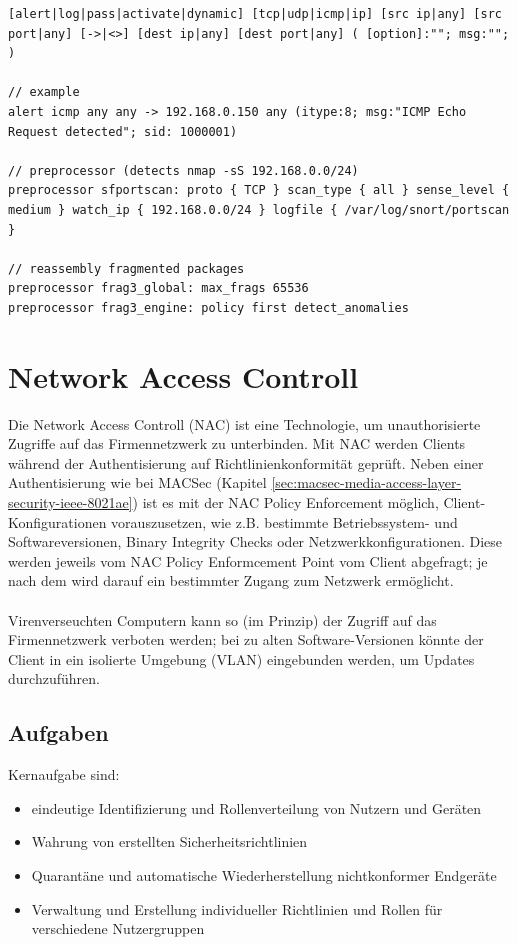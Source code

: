 \begin{lstlisting}
[alert|log|pass|activate|dynamic] [tcp|udp|icmp|ip] [src ip|any] [src port|any] [->|<>] [dest ip|any] [dest port|any] ( [option]:""; msg:""; )

// example
alert icmp any any -> 192.168.0.150 any (itype:8; msg:"ICMP Echo Request detected"; sid: 1000001)

// preprocessor (detects nmap -sS 192.168.0.0/24)
preprocessor sfportscan: proto { TCP } scan_type { all } sense_level { medium } watch_ip { 192.168.0.0/24 } logfile { /var/log/snort/portscan }

// reassembly fragmented packages
preprocessor frag3_global: max_frags 65536 
preprocessor frag3_engine: policy first detect_anomalies
\end{lstlisting}


\section{Network Access Controll}

Die Network Access Controll (NAC) ist eine Technologie, um unauthorisierte Zugriffe auf das Firmennetzwerk zu unterbinden. Mit NAC werden Clients während der Authentisierung auf Richtlinienkonformität geprüft. Neben einer Authentisierung wie bei MACSec (Kapitel \ref{sec:macsec-media-access-layer-security-ieee-8021ae}) ist es mit der NAC Policy Enforcement möglich, Client-Konfigurationen vorauszusetzen, wie z.B. bestimmte Betriebssystem- und Softwareversionen, Binary Integrity Checks oder Netzwerkkonfigurationen. Diese werden jeweils vom NAC Policy Enformcement Point vom Client abgefragt; je nach dem wird darauf ein bestimmter Zugang zum Netzwerk ermöglicht. \\\\
Virenverseuchten Computern kann so (im Prinzip) der Zugriff auf das Firmennetzwerk verboten werden; bei zu alten Software-Versionen könnte der Client in ein isolierte Umgebung (VLAN) eingebunden werden, um Updates durchzuführen. 

\subsection{Aufgaben}
Kernaufgabe sind:
\begin{itemize}
	\item eindeutige Identifizierung und Rollenverteilung von Nutzern und Geräten
	\item Wahrung von erstellten Sicherheitsrichtlinien
	\item Quarantäne und automatische Wiederherstellung nichtkonformer Endgeräte
	\item Verwaltung und Erstellung individueller Richtlinien und Rollen für verschiedene Nutzergruppen
\end{itemize}



